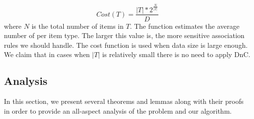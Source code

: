 \begin{equation}\label{eq:costfunc}
Cost(T)=\frac{|T|*2^{\frac{N}{|T|}}}{D}
\end{equation}
where $N$ is the total number of items in $T$. The function estimates the
average number of \qids per item type. The larger this value is, the more
sensitive association rules we should handle. The cost function is used when
data size is large enough. We claim that in cases when $|T|$ is relatively
small there is no need to apply DnC.

\subsection{Analysis}
\label{sec:analysis}

%

In this section, we present several theorems and lemmas along with their proofs
in order to provide an all-aspect analysis of the problem and our algorithm.

